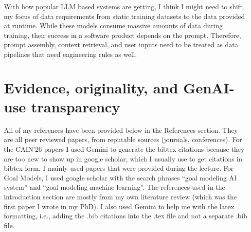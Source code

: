 With how popular LLM based systems are getting, I think I might need to shift my focus of data requirements from static training datasets to the data provided at runtime. While these models consume massive amounts of data during training, their success in a software product depends on the prompt. Therefore, prompt assembly, context retrieval, and user inputs need to be treated as data pipelines that need engineering rules as well.

\section{Evidence, originality, and GenAI-use transparency}
All of my references have been provided below in the References section. They are all peer reviewed papers, from reputable sources (journals, conferences). For the CAIN'26 papers I used Gemini to generate the bibtex citations because they are too new to show up in google scholar, which I usually use to get citations in bibtex form. I mainly used papers that were provided during the lecture. For Goal Models, I used google scholar with the search phrases ``goal modeling AI system'' and ``goal modeling machine learning''. The references used in the introduction section are mostly from my own literature review (which was the first paper I wrote in my PhD). I also used Gemini to help me with the latex formatting, i.e., adding the .bib citations into the .tex file and not a separate .bib file.
 

\printbibliography
 

